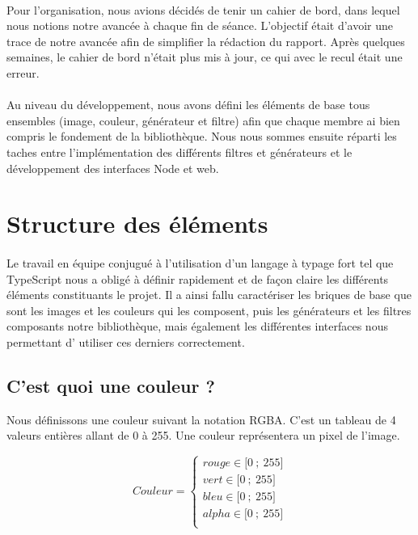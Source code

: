 \documentclass{article}
\begin{document}
\paragraph{}
Pour l'organisation, nous avions décidés de tenir un cahier de bord, dans lequel nous notions notre avancée à chaque fin de séance. L'objectif était d'avoir une trace de notre avancée afin de simplifier la rédaction du rapport. Après quelques semaines, le cahier de bord n'était plus mis à jour, ce qui avec le recul était une erreur.

\paragraph{}
Au niveau du développement, nous avons défini les éléments de base tous ensembles (image, couleur, générateur et filtre) afin que chaque membre ai bien compris le fondement de la bibliothèque. Nous nous sommes ensuite réparti les taches entre l'implémentation des différents filtres et générateurs et le développement des interfaces Node et web.

\section{Structure des éléments}

\paragraph{}
Le travail en équipe conjugué à l'utilisation d'un langage à typage fort tel que TypeScript nous a obligé à définir rapidement et de façon claire les différents éléments constituants le projet. Il a ainsi fallu caractériser les briques de base que sont les images et les couleurs qui les composent, puis les générateurs et les filtres composants notre bibliothèque, mais également les différentes interfaces nous permettant d' utiliser ces derniers correctement.

\subsection{C'est quoi une couleur ?}

Nous définissons une couleur suivant la notation RGBA. C'est un tableau de 4 valeurs entières allant de 0 à 255. Une couleur représentera un pixel de l'image.

\begin{equation*}
    Couleur = \left\{\begin{matrix}
            rouge \in \mathopen{[} 0~;~255 \mathclose{]}  \\
            vert \in \mathopen{[} 0~;~255 \mathclose{]}  \\
            bleu \in \mathopen{[} 0~;~255 \mathclose{]}  \\
            alpha \in \mathopen{[} 0~;~255 \mathclose{]}  \\
\end{matrix}\right.
\end{equation*}
\end{document}
